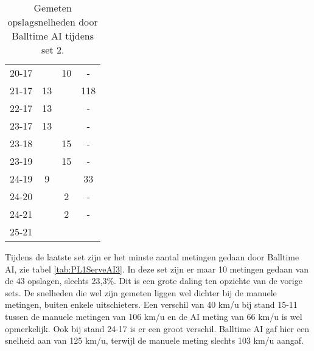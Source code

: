 \begin{table}[ht!]
\begin{tabular}{|c|c|c|c|}
    20-17 &  & 10 & - \\
    21-17 & 13 &  & 118 \\
    22-17 & 13 &  & - \\
    23-17 & 13 &  & - \\
    23-18 &  & 15 & - \\
    23-19 &  & 15 & - \\
    24-19 & 9 &  & 33 \\
    24-20 &  & 2 & - \\
    24-21 &  & 2 & - \\
    25-21 &  &  &  \\ \hline
  \end{tabular}
  \caption[Gemeten opslagsnelheden door Balltime AI tijdens set 2]{\label{tab:PL1ServeAI2}Gemeten opslagsnelheden door Balltime AI tijdens set 2.}
\end{table}

Tijdens de laatste set zijn er het minste aantal metingen gedaan door Balltime AI, zie tabel \ref{tab:PL1ServeAI3}. In deze set zijn er maar 10 metingen gedaan van de 43 opslagen, slechts 23,3\%. Dit is een grote daling ten opzichte van de vorige sets. De snelheden die wel zijn gemeten liggen wel dichter bij de manuele metingen, buiten enkele uitschieters. Een verschil van 40 km/u bij stand 15-11 tussen de manuele metingen van 106 km/u en de AI meting van 66 km/u is wel opmerkelijk. Ook bij stand 24-17 is er een groot verschil. Balltime AI gaf hier een snelheid aan van 125 km/u, terwijl de manuele meting slechts 103 km/u aangaf.

